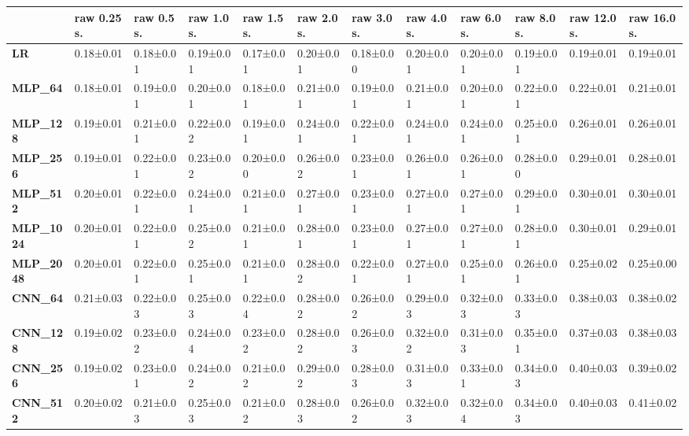 \begin{tabular}{llllllllllll}
\toprule
{} & raw 0.25 s. & raw 0.5 s. & raw 1.0 s. & raw 1.5 s. & raw 2.0 s. & raw 3.0 s. & raw 4.0 s. & raw 6.0 s. & raw 8.0 s. & raw 12.0 s. & raw 16.0 s. \\
\midrule
\textbf{LR            } &   0.18±0.01 &  0.18±0.01 &  0.19±0.01 &  0.17±0.01 &  0.20±0.01 &  0.18±0.00 &  0.20±0.01 &  0.20±0.01 &  0.19±0.01 &   0.19±0.01 &   0.19±0.01 \\
\textbf{MLP\_64        } &   0.18±0.01 &  0.19±0.01 &  0.20±0.01 &  0.18±0.01 &  0.21±0.01 &  0.19±0.01 &  0.21±0.01 &  0.20±0.01 &  0.22±0.01 &   0.22±0.01 &   0.21±0.01 \\
\textbf{MLP\_128       } &   0.19±0.01 &  0.21±0.01 &  0.22±0.02 &  0.19±0.01 &  0.24±0.01 &  0.22±0.01 &  0.24±0.01 &  0.24±0.01 &  0.25±0.01 &   0.26±0.01 &   0.26±0.01 \\
\textbf{MLP\_256       } &   0.19±0.01 &  0.22±0.01 &  0.23±0.02 &  0.20±0.00 &  0.26±0.02 &  0.23±0.01 &  0.26±0.01 &  0.26±0.01 &  0.28±0.00 &   0.29±0.01 &   0.28±0.01 \\
\textbf{MLP\_512       } &   0.20±0.01 &  0.22±0.01 &  0.24±0.01 &  0.21±0.01 &  0.27±0.01 &  0.23±0.01 &  0.27±0.01 &  0.27±0.01 &  0.29±0.01 &   0.30±0.01 &   0.30±0.01 \\
\textbf{MLP\_1024      } &   0.20±0.01 &  0.22±0.01 &  0.25±0.02 &  0.21±0.01 &  0.28±0.01 &  0.23±0.01 &  0.27±0.01 &  0.27±0.01 &  0.28±0.01 &   0.30±0.01 &   0.29±0.01 \\
\textbf{MLP\_2048      } &   0.20±0.01 &  0.22±0.01 &  0.25±0.01 &  0.21±0.01 &  0.28±0.02 &  0.22±0.01 &  0.27±0.01 &  0.25±0.01 &  0.26±0.01 &   0.25±0.02 &   0.25±0.00 \\
\textbf{CNN\_64        } &   0.21±0.03 &  0.22±0.03 &  0.25±0.03 &  0.22±0.04 &  0.28±0.02 &  0.26±0.02 &  0.29±0.03 &  0.32±0.03 &  0.33±0.03 &   0.38±0.03 &   0.38±0.02 \\
\textbf{CNN\_128       } &   0.19±0.02 &  0.23±0.02 &  0.24±0.04 &  0.23±0.02 &  0.28±0.02 &  0.26±0.03 &  0.32±0.02 &  0.31±0.03 &  0.35±0.01 &   0.37±0.03 &   0.38±0.03 \\
\textbf{CNN\_256       } &   0.19±0.02 &  0.23±0.01 &  0.24±0.02 &  0.21±0.02 &  0.29±0.02 &  0.28±0.03 &  0.31±0.03 &  0.33±0.01 &  0.34±0.03 &   0.40±0.03 &   0.39±0.02 \\
\textbf{CNN\_512       } &   0.20±0.02 &  0.21±0.03 &  0.25±0.03 &  0.21±0.02 &  0.28±0.03 &  0.26±0.02 &  0.32±0.03 &  0.32±0.04 &  0.34±0.03 &   0.40±0.03 &   0.41±0.02 \\

\end{tabular}
